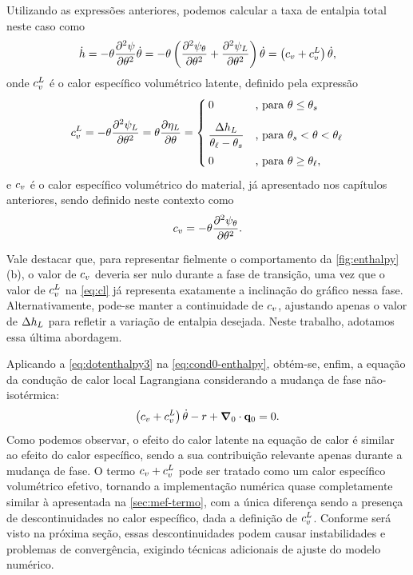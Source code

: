 \documentclass[Tese.tex]{subfiles}
\begin{document}
Utilizando as expressões anteriores, podemos calcular a taxa de entalpia total neste caso como
\begin{equation}\label{eq:dotenthalpy3}
\dot{h} = - \theta\dfrac{\partial^2\psi}{\partial\theta^2}\dot{\theta} = - \theta\left(\dfrac{\partial^2\psi_{\theta}}{\partial\theta^2} + \dfrac{\partial^2\psi_L}{\partial\theta^2}\right)\dot{\theta} = \left(c_v + c_v^L\right)\dot{\theta},
\end{equation}
onde $c_v^L$ é o calor específico volumétrico latente, definido pela expressão
\begin{equation}\label{eq:cl}
c_v^L = -\theta\dfrac{\partial^2\psi_L}{\partial\theta^2} = \theta\dfrac{\partial\eta_L}{\partial\theta} =
\begin{cases}
0 			&\text{, para }\theta \leq \theta_s\\[0.3cm]
\dfrac{\Delta h_L}{\theta_\ell-\theta_s} &\text{, para }\theta_s < \theta < \theta_\ell \\[0.3cm]
0			&\text{, para }\theta \geq \theta_\ell,
\end{cases}
\end{equation}
e $c_v$ é o calor específico volumétrico do material, já apresentado nos capítulos anteriores, sendo definido neste contexto como
\begin{equation}
c_v = -\theta\dfrac{\partial^2 \psi_{\theta}}{\partial \theta^2}.
\end{equation}

Vale destacar que, para representar fielmente o comportamento da \cref{fig:enthalpy}(b), o valor de $c_v$ deveria ser nulo durante a fase de transição, uma vez que o valor de $c_v^L$ na \cref{eq:cl} já representa exatamente a inclinação do gráfico nessa fase. Alternativamente, pode-se manter a continuidade de $c_v$, ajustando apenas o valor de $\Delta h_L$ para refletir a variação de entalpia desejada. Neste trabalho, adotamos essa última abordagem.

Aplicando a \cref{eq:dotenthalpy3} na \cref{eq:cond0-enthalpy}, obtém-se, enfim, a equação da condução de calor local Lagrangiana considerando a mudança de fase não-isotérmica:
\begin{equation}\label{eq:cond-enthalpy}
\left(c_v + c_v^L\right)\dot{\theta} - r + \boldsymbol{\nabla}_0\cdot\mathbf{q}_0 = 0.
\end{equation}
Como podemos observar, o efeito do calor latente na equação de calor é similar ao efeito do calor específico, sendo a sua contribuição relevante apenas durante a mudança de fase. O termo $c_v + c_v^L$ pode ser tratado como um calor específico volumétrico efetivo, tornando a implementação numérica quase completamente similar à apresentada na \cref{sec:mef-termo}, com a única diferença sendo a presença de descontinuidades no calor específico, dada a definição de $c_v^L$. Conforme será visto na próxima seção, essas descontinuidades podem causar instabilidades e problemas de convergência, exigindo técnicas adicionais de ajuste do modelo numérico.
\end{document}
